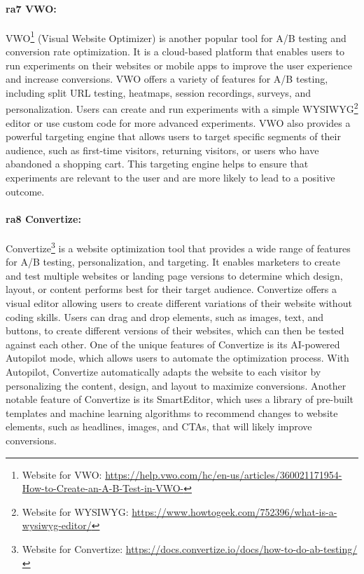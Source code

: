 \paragraph{\ac{ra}7 VWO:}
VWO\footnote{Website for VWO: \url{https://help.vwo.com/hc/en-us/articles/360021171954-How-to-Create-an-A-B-Test-in-VWO-}} (Visual Website Optimizer) is another popular tool for A/B testing and conversion rate optimization. 
It is a cloud-based platform that enables users to run experiments on their websites or mobile apps to improve the user experience and increase conversions.
VWO offers a variety of features for A/B testing, including split URL testing, heatmaps, session recordings, surveys, and personalization. 
Users can create and run experiments with a simple WYSIWYG\footnote{Website for WYSIWYG: \url{https://www.howtogeek.com/752396/what-is-a-wysiwyg-editor/}} editor or use custom code for more advanced experiments.
VWO also provides a powerful targeting engine that allows users to target specific segments of their audience, such as first-time visitors, returning visitors, or users who have abandoned a shopping cart. 
This targeting engine helps to ensure that experiments are relevant to the user and are more likely to lead to a positive outcome.

\paragraph{\ac{ra}8 Convertize:}
Convertize\footnote{Website for Convertize: \url{https://docs.convertize.io/docs/how-to-do-ab-testing/}} is a website optimization tool that provides a wide range of features for A/B testing, personalization, and targeting. 
It enables marketers to create and test multiple websites or landing page versions to determine which design, layout, or content performs best for their target audience.
Convertize offers a visual editor allowing users to create different variations of their website without coding skills. 
Users can drag and drop elements, such as images, text, and buttons, to create different versions of their websites, which can then be tested against each other.
One of the unique features of Convertize is its AI-powered Autopilot mode, which allows users to automate the optimization process. With Autopilot, Convertize automatically adapts the website to each visitor by personalizing the content, design, and layout to maximize conversions.
Another notable feature of Convertize is its SmartEditor, which uses a library of pre-built templates and machine learning algorithms to recommend changes to website elements, such as headlines, images, and CTAs, that will likely improve conversions.


